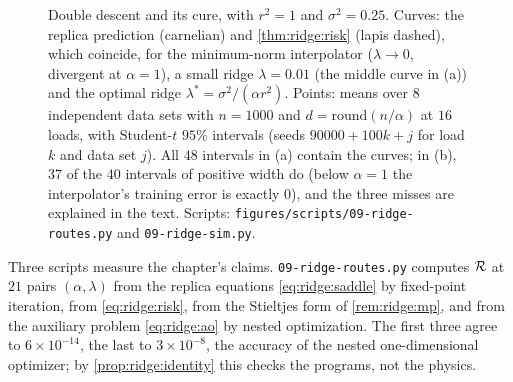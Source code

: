 \begin{refsection}
\begin{figure}[t]
\begin{fullwidth}

\vspace{1mm}
\end{fullwidth}
\caption{Double descent and its cure, with $r^2=1$ and $\sigma^2=0.25$. Curves: the replica prediction (carnelian) and \cref{thm:ridge:risk} (lapis dashed), which coincide, for the minimum-norm interpolator ($\lambda\to0$, divergent at $\alpha=1$), a small ridge $\lambda=0.01$ (the middle curve in (a)) and the optimal ridge $\lambda^*=\sigma^2/(\alpha r^2)$. Points: means over $8$ independent data sets with $n=1000$ and $d=\mathrm{round}(n/\alpha)$ at $16$ loads, with Student-$t$ $95\%$ intervals (seeds $90000+100k+j$ for load $k$ and data set $j$). All $48$ intervals in (a) contain the curves; in (b), $37$ of the $40$ intervals of positive width do (below $\alpha=1$ the interpolator's training error is exactly $0$), and the three misses are explained in the text. Scripts: \texttt{figures/scripts/09-ridge-routes.py} and \texttt{09-ridge-sim.py}.}\label{fig:ridge:curves}
\end{figure}

Three scripts measure the chapter's claims. \texttt{09-ridge-routes.py} computes $\mathcal{R}$ at $21$ pairs $(\alpha,\lambda)$ from the replica equations \eqref{eq:ridge:saddle} by fixed-point iteration, from \eqref{eq:ridge:risk}, from the Stieltjes form of \cref{rem:ridge:mp}, and from the auxiliary problem \eqref{eq:ridge:ao} by nested optimization. The first three agree to $6\times10^{-14}$, the last to $3\times10^{-8}$, the accuracy of the nested one-dimensional optimizer; by \cref{prop:ridge:identity} this checks the programs, not the physics.


\end{refsection}
